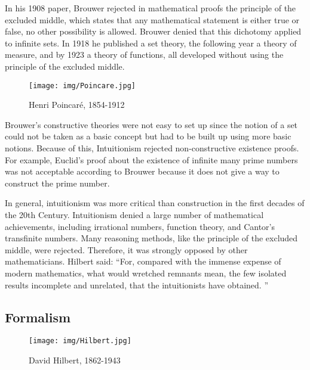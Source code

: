 \documentclass[b5paper]{article}
\begin{document}
In his 1908 paper, Brouwer rejected in mathematical proofs the principle of the excluded middle, which states that any mathematical statement is either true or false, no other possibility is allowed. Brouwer denied that this dichotomy applied to infinite sets. In 1918 he published a set theory, the following year a theory of measure, and by 1923 a theory of functions, all developed without using the principle of the excluded middle.

\begin{wrapfigure}{R}{0.3\textwidth}
 \centering
 \texttt{[image: img/Poincare.jpg]}
 \captionsetup{labelformat=empty}
 \caption{Henri Poincaré, 1854-1912}
 \label{fig:Poincare}
\end{wrapfigure}

Brouwer's constructive theories were not easy to set up since the notion of a set could not be taken as a basic concept but had to be built up using more basic notions. Because of this, Intuitionism rejected non-constructive existence proofs. For example, Euclid's proof about the existence of infinite many prime numbers was not acceptable according to Brouwer because it does not give a way to construct the prime number.

In general, intuitionism was more critical than construction in the first decades of the 20th Century. Intuitionism denied a large number of mathematical achievements, including irrational numbers, function theory, and Cantor's transfinite numbers. Many reasoning methods, like the principle of the excluded middle, were rejected. Therefore, it was strongly opposed by other mathematicians. Hilbert said: ``For, compared with the immense expense of modern mathematics, what would wretched remnants mean, the few isolated results incomplete and unrelated, that the intuitionists have obtained. ''


\subsection{Formalism}

\begin{wrapfigure}{L}{0.5\textwidth}
 \centering
 \texttt{[image: img/Hilbert.jpg]}
 \captionsetup{labelformat=empty}
 \caption{David Hilbert, 1862-1943}
 \label{fig:Hilbert}
\end{wrapfigure}
\end{document}
